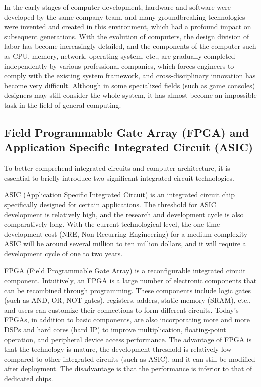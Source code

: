In the early stages of computer development, hardware and software were developed by the same company team, and many groundbreaking technologies were invented and created in this environment, which had a profound impact on subsequent generations. With the evolution of computers, the design division of labor has become increasingly detailed, and the components of the computer such as CPU, memory, network, operating system, etc., are gradually completed independently by various professional companies, which forces engineers to comply with the existing system framework, and cross-disciplinary innovation has become very difficult. Although in some specialized fields (such as game consoles) designers may still consider the whole system, it has almost become an impossible task in the field of general computing.

\subsection{Field Programmable Gate Array (FPGA) and Application Specific Integrated Circuit (ASIC)}

To better comprehend integrated circuits and computer architecture, it is essential to briefly introduce two significant integrated circuit technologies.

ASIC (Application Specific Integrated Circuit) is an integrated circuit chip specifically designed for certain applications. The threshold for ASIC development is relatively high, and the research and development cycle is also comparatively long. With the current technological level, the one-time development cost (NRE, Non-Recurring Engineering) for a medium-complexity ASIC will be around several million to ten million dollars, and it will require a development cycle of one to two years.

FPGA (Field Programmable Gate Array) is a reconfigurable integrated circuit component. Intuitively, an FPGA is a large number of electronic components that can be recombined through programming. These components include logic gates (such as AND, OR, NOT gates), registers, adders, static memory (SRAM), etc., and users can customize their connections to form different circuits. Today's FPGAs, in addition to basic components, are also incorporating more and more DSPs and hard cores (hard IP) to improve multiplication, floating-point operation, and peripheral device access performance. The advantage of FPGA is that the technology is mature, the development threshold is relatively low compared to other integrated circuits (such as ASIC), and it can still be modified after deployment. The disadvantage is that the performance is inferior to that of dedicated chips.

